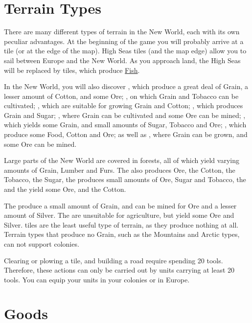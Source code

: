 \documentclass[12pt]{book}
\begin{document}
\hypertarget{Terrain Types}{\section{Terrain Types}}

There are many different types of terrain in the New World, each with
its own peculiar advantages. At the beginning of the game you will
probably arrive at a  tile (or at the edge of the
map). High Seas tiles (and the map edge) allow you to sail between
Europe and the New World. As you approach land, the High Seas will be
replaced by  tiles, which produce
\hyperlink{Fish}{Fish}.

In the New World, you will also discover , which
produce a great deal of Grain, a lesser amount of Cotton, and some
Ore; , on which Grain and Tobacco can be
cultivated; , which are suitable for growing Grain
and Cotton; , which produces Grain and Sugar;
, where Grain can be cultivated and some Ore can be
mined; , which yields some Grain, and small amounts of
Sugar, Tobacco and Ore; , which produce some Food,
Cotton and Ore; as well as , where Grain can be grown,
and some Ore can be mined.

Large parts of the New World are covered in forests, all of which
yield varying amounts of Grain, Lumber and Furs. The  also produces Ore, the  Cotton, the
 Tobacco, the  Sugar,
the  produces small amounts of Ore, Sugar and
Tobacco, the  and the 
yield some Ore, and the  Cotton.

The  produce a small amount of Grain, and can be mined
for Ore and a lesser amount of Silver. The  are
unsuitable for agriculture, but yield some Ore and Silver.
 tiles are the least useful type of terrain, as they
produce nothing at all. Terrain types that produce no Grain, such as
the Mountains and Arctic types, can not support colonies.

Clearing or plowing a tile, and building a road require spending 20
tools. Therefore, these actions can only be carried out by units
carrying at least 20 tools. You can equip your units in your colonies
or in Europe.

\hypertarget{Goods}{\section{Goods}}
\end{document}

